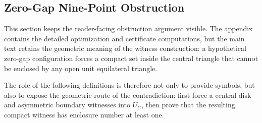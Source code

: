 \subsection{Zero-Gap Nine-Point Obstruction}
\label{sec:strategy4-reader}

This section keeps the reader-facing obstruction argument visible.  The
appendix contains the detailed optimization and certificate computations, but
the main text retains the geometric meaning of the witness construction: a
hypothetical zero-gap configuration forces a compact set inside the central
triangle that cannot be enclosed by any open unit equilateral triangle.

The role of the following definitions is therefore not only to provide symbols,
but also to expose the geometric route of the contradiction: first force a
central disk and asymmetric boundary witnesses into $U_C$, then prove that the
resulting compact witness has enclosure number at least one.


